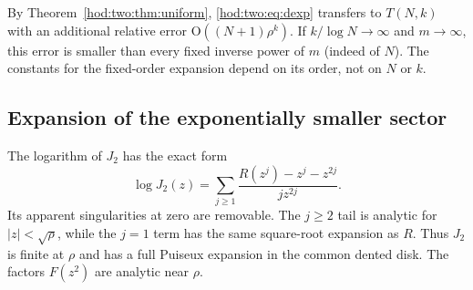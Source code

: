 \documentclass[11pt,letterpaper]{article}
\theoremstyle{definition}\newtheorem{definition}[theorem]{Definition}
\theoremstyle{remark}\newtheorem{remark}[theorem]{Remark}
\newcommand{\bigO}{\mathrm O}
\begin{document}
By Theorem~\ref{hod:two:thm:uniform}, \eqref{hod:two:eq:dexp} transfers to $T(N,k)$ with an additional relative error $\bigO((N+1)\rho^k)$. If $k/\log N\to\infty$ and $m\to\infty$, this error is smaller than every fixed inverse power of $m$ (indeed of $N$). The constants for the fixed-order expansion depend on its order, not on $N$ or $k$.

\subsection{Expansion of the exponentially smaller sector}
The logarithm of $J_2$ has the exact form
\begin{equation}\label{hod:two:eq:Jtwolog}
\log J_2(z)=\sum_{j\ge1}
\frac{R(z^j)-z^j-z^{2j}}{jz^{2j}}.
\end{equation}
Its apparent singularities at zero are removable. The $j\ge2$ tail is analytic for $|z|<\sqrt\rho$, while the $j=1$ term has the same square-root expansion as $R$. Thus $J_2$ is finite at $\rho$ and has a full Puiseux expansion in the common dented disk. The factors $F(z^2)$ are analytic near $\rho$.
\end{document}
